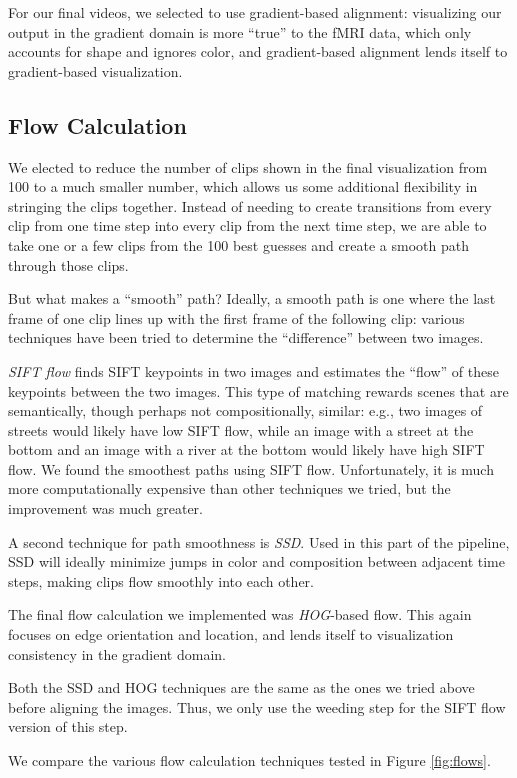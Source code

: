 For our final videos, we selected to use gradient-based alignment: visualizing our output in the gradient domain is more ``true'' to the fMRI data, which only accounts for shape and ignores color, and gradient-based alignment lends itself to gradient-based visualization.

\subsection{Flow Calculation}
We elected to reduce the number of clips shown in the final visualization from 100 to a much smaller number, which allows us some additional flexibility in stringing the clips together.  Instead of needing to create transitions from every clip from one time step into every clip from the next time step, we are able to take one or a few clips from the 100 best guesses and create a smooth path through those clips.

But what makes a ``smooth'' path?  Ideally, a smooth path is one where the last frame of one clip lines up with the first frame of the following clip: various techniques have been tried to determine the ``difference'' between two images.

\emph{SIFT flow} \cite{SIFTflow} finds SIFT keypoints in two images and estimates the ``flow'' of these keypoints between the two images. This type of matching rewards scenes that are semantically, though perhaps not compositionally, similar: e.g., two images of streets would likely have low SIFT flow, while an image with a street at the bottom and an image with a river at the bottom would likely have high SIFT flow.  We found the smoothest paths using SIFT flow. Unfortunately, it is much more computationally expensive than other techniques we tried, but the improvement was much greater.

A second technique for path smoothness is \emph{SSD}.  Used in this part of the pipeline, SSD will ideally minimize jumps in color and composition between adjacent time steps, making clips flow smoothly into each other.

The final flow calculation we implemented was \emph{HOG}-based flow.  This again focuses on edge orientation and location, and lends itself to visualization consistency in the gradient domain.

Both the SSD and HOG techniques are the same as the ones we tried above before aligning the images. Thus, we only use the weeding step for the SIFT flow version of this step.

We compare the various flow calculation techniques tested in Figure \ref{fig:flows}.

